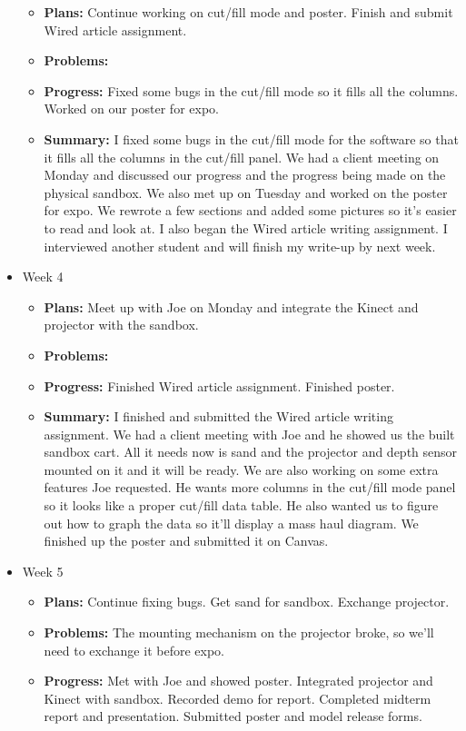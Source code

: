 \documentclass[onecolumn, draftclsnofoot,10pt, compsoc]{IEEEtran}
\begin{document}
\begin{itemize}
\begin{itemize}
	\item \textbf{Plans:} Continue working on cut/fill mode and poster. Finish and submit Wired article assignment.
    \item \textbf{Problems:} 
    \item \textbf{Progress:} Fixed some bugs in the cut/fill mode so it fills all the columns. Worked on our poster for expo.
    \item \textbf{Summary:} I fixed some bugs in the cut/fill mode for the software so that it fills all the columns in the cut/fill panel. We had a client meeting on Monday and discussed our progress and the progress being made on the physical sandbox. We also met up on Tuesday and worked on the poster for expo. We rewrote a few sections and added some pictures so it's easier to read and look at. I also began the Wired article writing assignment. I interviewed another student and will finish my write-up by next week.
	\end{itemize}
\item Week 4
	\begin{itemize}
	\item \textbf{Plans:} Meet up with Joe on Monday and integrate the Kinect and projector with the sandbox.
    \item \textbf{Problems:} 
    \item \textbf{Progress:} Finished Wired article assignment. Finished poster.
    \item \textbf{Summary:} I finished and submitted the Wired article writing assignment. We had a client meeting with Joe and he showed us the built sandbox cart. All it needs now is sand and the projector and depth sensor mounted on it and it will be ready. We are also working on some extra features Joe requested. He wants more columns in the cut/fill mode panel so it looks like a proper cut/fill data table. He also wanted us to figure out how to graph the data so it'll display a mass haul diagram. We finished up the poster and submitted it on Canvas.
	\end{itemize}
\item Week 5
	\begin{itemize}
	\item \textbf{Plans:} Continue fixing bugs. Get sand for sandbox. Exchange projector.
    \item \textbf{Problems:} The mounting mechanism on the projector broke, so we'll need to exchange it before expo.
    \item \textbf{Progress:} Met with Joe and showed poster. Integrated projector and Kinect with sandbox. Recorded demo for report. Completed midterm report and presentation. Submitted poster and model release forms.

\end{itemize}
\end{itemize}
\end{document}
